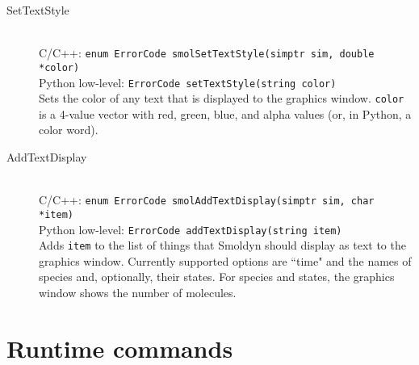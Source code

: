 \documentclass {book}
\newcommand {\ttt} {\texttt}
\begin{document}
\begin{description}
\item[SetTextStyle]
\hfill \\
C/C++: \ttt{enum ErrorCode smolSetTextStyle(simptr sim, double *color)}\\
Python low-level: \ttt{ErrorCode setTextStyle(string color)}\\
Sets the color of any text that is displayed to the graphics window. \ttt{color} is a 4-value vector with red, green, blue, and alpha values (or, in Python, a color word).

\item[AddTextDisplay]
\hfill \\
C/C++: \ttt{enum ErrorCode smolAddTextDisplay(simptr sim, char *item)}\\
Python low-level: \ttt{ErrorCode addTextDisplay(string item)}\\
Adds \ttt{item} to the list of things that Smoldyn should display as text to the graphics window. Currently supported options are ``time" and the names of species and, optionally, their states. For species and states, the graphics window shows the number of molecules.

\end{description}

\section{Runtime commands}
\end{document}
